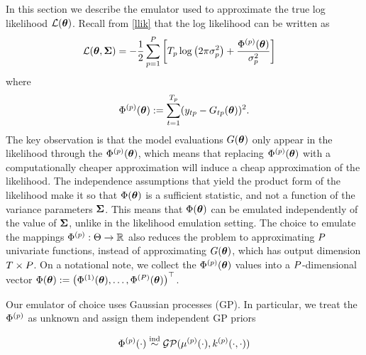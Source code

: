 \documentclass[12pt]{article}
\begin{document}
In this section we describe the emulator used to approximate the true log likelihood $\mathcal{L}(\boldsymbol{\theta})$. Recall from \ref{llik} that the log likelihood can be written as 
\begin{align*}
\mathcal{L}(\boldsymbol{\theta}, \boldsymbol{\Sigma}) &= -\frac{1}{2} \sum_{p = 1}^{P} \left[T_{p} \log\left(2\pi \sigma_{p}^2 \right) + \frac{\Phi^{(p)}(\boldsymbol{\theta})}{\sigma_{p}^2} \right] 
\end{align*}
where 
\[\Phi^{(p)}(\boldsymbol{\theta}) := \sum_{t = 1}^{T_{p}} (y_{t p} - G_{t p}(\boldsymbol{\theta}))^2.\]
The key observation 
is that the model evaluations $G(\boldsymbol{\theta})$ only appear in the likelihood through the $\Phi^{(p)}(\boldsymbol{\theta})$, which means that replacing $\Phi^{(p)}(\boldsymbol{\theta})$ with a
computationally cheaper approximation will induce a cheap approximation of the likelihood. The independence assumptions 
that yield the product form of the likelihood make it so that $\Phi(\boldsymbol{\theta})$ is a sufficient statistic, and not a function of the variance parameters $\boldsymbol{\Sigma}$. 
This means that $\Phi(\boldsymbol{\theta})$ can be emulated independently of the value of $\boldsymbol{\Sigma}$, unlike in the likelihood emulation setting. 
The choice to emulate the mappings $\Phi^{(p)}: \Theta \to \mathbb{R}$ also reduces the problem to 
approximating $P$ univariate functions, instead of approximating $G(\boldsymbol{\theta})$, which has output dimension $T \times P$. On a notational note, we collect the $\Phi^{(p)}(\boldsymbol{\theta})$ values into a $P$-dimensional 
vector $\Phi(\boldsymbol{\theta}) := \begin{pmatrix} \Phi^{(1)}(\boldsymbol{\theta}), \dots, \Phi^{(P)}(\boldsymbol{\theta}) \end{pmatrix}^\top$.  

Our emulator of choice uses Gaussian processes (GP). In particular, we treat the $\Phi^{(p)}$ as unknown and assign them independent GP priors

\[\Phi^{(p)}(\cdot) \overset{\text{ind}}{\sim} \mathcal{GP}(\mu^{(p)}(\cdot), k^{(p)}(\cdot, \cdot))\] 
\end{document}
